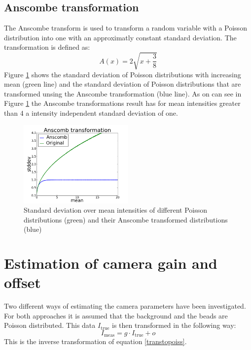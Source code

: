 \subsection{Anscombe transformation}
\label{trafoAnscombe}
The Anscombe transform \cite{anscombe} is used to transform a random variable with a Poisson
distribution into one with an approximatly constant standard deviation. The
transformation is defined as:
\begin{equation}
	A(x) = 2\sqrt{x+\frac{3}{8}}
\end{equation}
Figure \ref{anscombe} shows the standard deviation of Poisson distributions with increasing mean (green line) and the standard deviation of Poisson distributions that are transformed unsing the Anscombe transformation (blue line). As on can see in Figure \ref{anscombe} the Anscombe transformations result has
for mean intensities greater than 4 a intensity independent standard deviation of
one.
\begin{figure}
	\centering
	\includegraphics[width = 0.5\textwidth]{pictures/anscombe.png}
	\caption{Standard deviation over mean intensities of different Poisson
	distributions (green) and their Anscombe transformed distributions (blue)}
	\label{anscombe}	
\end{figure}
 

\section{Estimation of camera gain and offset}\label{estimationCameraGain}
Two different ways of estimating the camera parameters have been investigated. For both approaches it is assumed that the background and the beads are Poisson distributed. This data $I_\text{true}$ is then transformed in the following way:
\begin{equation}
	I_\text{meas} = g \cdot I_\text{true} + o \label{trafoGain}
\end{equation}
This is the inverse transformation of equation \ref{transtopoiss}.
